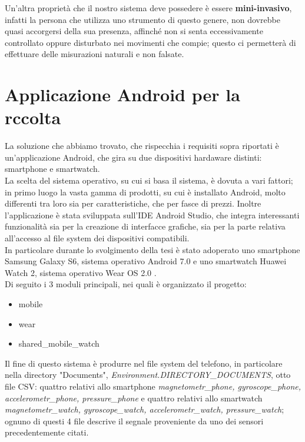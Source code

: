 \documentclass[a4paper, oneside]{book}
\begin{document}
\makebox[\linewidth]{}
Un'altra proprietà che il nostro sistema deve possedere è essere \textbf{mini-invasivo}, infatti la persona che utilizza uno strumento di questo genere, non dovrebbe quasi accorgersi della sua presenza, affinché non si senta eccessivamente controllato oppure disturbato nei movimenti che compie; questo ci permetterà di effettuare delle misurazioni naturali e non falsate.


	\section{Applicazione Android per la rccolta}
La soluzione che abbiamo trovato, che rispecchia i requisiti sopra riportati è un'applicazione Android, che gira su due dispositivi hardaware distinti: smartphone e smartwatch. \\ 
La scelta del sistema operativo, su cui si basa il sistema, è dovuta a vari fattori; in primo luogo la vasta gamma di prodotti, su cui è installato Android, molto differenti tra loro sia per caratteristiche, che per fasce di prezzi. Inoltre l'applicazione è stata sviluppata sull’IDE Android Studio, che integra interessanti funzionalità sia per la creazione di interfacce grafiche, sia per la parte relativa all’accesso al file system dei dispositivi compatibili. \\
In particolare durante lo svolgimento della tesi è stato adoperato uno smartphone Samsung Galaxy S6, sistema operativo Android 7.0 e uno smartwatch Huawei Watch 2, sistema operativo Wear OS 2.0 . \\
Di seguito i 3 moduli principali, nei quali è organizzato il progetto:
\begin{itemize}
\item mobile
\item wear
\item shared\_mobile\_watch \\
\end{itemize}
Il fine di questo sistema è produrre nel file system del telefono, in particolare nella directory "Documents", \textit{Environment.DIRECTORY\_DOCUMENTS}, otto file CSV: quattro relativi allo smartphone \textit{magnetometr\_phone, gyroscope\_phone, accelerometr\_phone, pressure\_phone} e quattro relativi allo smartwatch \textit{magnetometr\_watch, gyroscope\_watch, accelerometr\_watch, pressure\_watch}; ognuno di questi 4 file descrive il segnale proveniente da uno dei sensori precedentemente citati. \\
\end{document}
